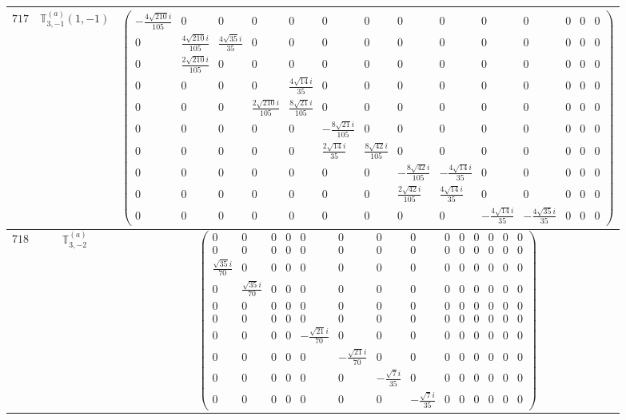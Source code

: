 \documentclass[fleqn,8pt,landscape]{jsarticle}
\begin{document}
\begin{center}
\begin{longtable}{ccc}
$ 717 $ & $ \mathbb{T}_{3,-1}^{(a)}(1,-1) $ & $ \begin{pmatrix} - \frac{4 \sqrt{210} i}{105} & 0 & 0 & 0 & 0 & 0 & 0 & 0 & 0 & 0 & 0 & 0 & 0 & 0 \\ 0 & \frac{4 \sqrt{210} i}{105} & \frac{4 \sqrt{35} i}{35} & 0 & 0 & 0 & 0 & 0 & 0 & 0 & 0 & 0 & 0 & 0 \\ 0 & \frac{2 \sqrt{210} i}{105} & 0 & 0 & 0 & 0 & 0 & 0 & 0 & 0 & 0 & 0 & 0 & 0 \\ 0 & 0 & 0 & 0 & \frac{4 \sqrt{14} i}{35} & 0 & 0 & 0 & 0 & 0 & 0 & 0 & 0 & 0 \\ 0 & 0 & 0 & \frac{2 \sqrt{210} i}{105} & \frac{8 \sqrt{21} i}{105} & 0 & 0 & 0 & 0 & 0 & 0 & 0 & 0 & 0 \\ 0 & 0 & 0 & 0 & 0 & - \frac{8 \sqrt{21} i}{105} & 0 & 0 & 0 & 0 & 0 & 0 & 0 & 0 \\ 0 & 0 & 0 & 0 & 0 & \frac{2 \sqrt{14} i}{35} & \frac{8 \sqrt{42} i}{105} & 0 & 0 & 0 & 0 & 0 & 0 & 0 \\ 0 & 0 & 0 & 0 & 0 & 0 & 0 & - \frac{8 \sqrt{42} i}{105} & - \frac{4 \sqrt{14} i}{35} & 0 & 0 & 0 & 0 & 0 \\ 0 & 0 & 0 & 0 & 0 & 0 & 0 & \frac{2 \sqrt{42} i}{105} & \frac{4 \sqrt{14} i}{35} & 0 & 0 & 0 & 0 & 0 \\ 0 & 0 & 0 & 0 & 0 & 0 & 0 & 0 & 0 & - \frac{4 \sqrt{14} i}{35} & - \frac{4 \sqrt{35} i}{35} & 0 & 0 & 0 \end{pmatrix} $ \\ \hline
$ 718 $ & $ \mathbb{T}_{3,-2}^{(a)} $ & $ \begin{pmatrix} 0 & 0 & 0 & 0 & 0 & 0 & 0 & 0 & 0 & 0 & 0 & 0 & 0 & 0 \\ 0 & 0 & 0 & 0 & 0 & 0 & 0 & 0 & 0 & 0 & 0 & 0 & 0 & 0 \\ \frac{\sqrt{35} i}{70} & 0 & 0 & 0 & 0 & 0 & 0 & 0 & 0 & 0 & 0 & 0 & 0 & 0 \\ 0 & \frac{\sqrt{35} i}{70} & 0 & 0 & 0 & 0 & 0 & 0 & 0 & 0 & 0 & 0 & 0 & 0 \\ 0 & 0 & 0 & 0 & 0 & 0 & 0 & 0 & 0 & 0 & 0 & 0 & 0 & 0 \\ 0 & 0 & 0 & 0 & 0 & 0 & 0 & 0 & 0 & 0 & 0 & 0 & 0 & 0 \\ 0 & 0 & 0 & 0 & - \frac{\sqrt{21} i}{70} & 0 & 0 & 0 & 0 & 0 & 0 & 0 & 0 & 0 \\ 0 & 0 & 0 & 0 & 0 & - \frac{\sqrt{21} i}{70} & 0 & 0 & 0 & 0 & 0 & 0 & 0 & 0 \\ 0 & 0 & 0 & 0 & 0 & 0 & - \frac{\sqrt{7} i}{35} & 0 & 0 & 0 & 0 & 0 & 0 & 0 \\ 0 & 0 & 0 & 0 & 0 & 0 & 0 & - \frac{\sqrt{7} i}{35} & 0 & 0 & 0 & 0 & 0 & 0 \end{pmatrix} $ \\ \hline

\end{longtable}
\end{center}
\end{document}

